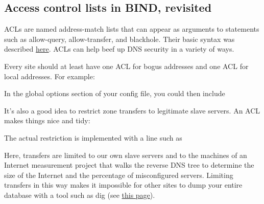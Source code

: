 \protect\hypertarget{part0024_split_054.html}{}{}

\hypertarget{part0024_split_054.htmlux5cux23_idContainer1069}{}
\hypertarget{part0024_split_054.htmlux5cux23calibre_pb_53}{%
\subsection[Access control lists in BIND,
revisited]{\texorpdfstring{\protect\hypertarget{part0024_split_054.htmlux5cux23_idTextAnchor933}{}{}Access
control lists in BIND,
revisited}{Access control lists in BIND, revisited}}\label{part0024_split_054.htmlux5cux23calibre_pb_53}}

\protect\hypertarget{part0024_split_054.htmlux5cux23_idIndexMarker2235}{}{}\protect\hypertarget{part0024_split_054.htmlux5cux23_idIndexMarker2236}{}{}\protect\hypertarget{part0024_split_054.htmlux5cux23_idIndexMarker2237}{}{}ACLs
are named address-match lists that can appear as arguments to statements
such as
\protect\hypertarget{part0024_split_054.htmlux5cux23_idIndexMarker2238}{}{}{allow-query},
\protect\hypertarget{part0024_split_054.htmlux5cux23_idIndexMarker2239}{}{}{allow-transfer},
and
\protect\hypertarget{part0024_split_054.htmlux5cux23_idIndexMarker2240}{}{}{blackhole}.
Their basic syntax was described
\protect\hyperlink{part0024_split_038.htmlux5cux23_idTextAnchor904}{here}.
ACLs can help beef up DNS security in a variety of ways.

Every site should at least have one ACL for bogus addresses and one ACL
for local addresses. For example:


In the global {options} section of your config file, you could then
include


It's also a good idea to restrict zone transfers to legitimate slave
servers. An ACL makes things nice and tidy:


The actual restriction is implemented with a line such as


Here, transfers are limited to our own slave servers and to the machines
of an Internet measurement project that walks the reverse DNS tree to
determine the size of the Internet and the percentage of misconfigured
servers. Limiting transfers in this way makes it impossible for other
sites to dump your entire database with a tool such as {dig} (see
\protect\hyperlink{part0024_split_018.htmlux5cux23_idTextAnchor863}{this
page}).

